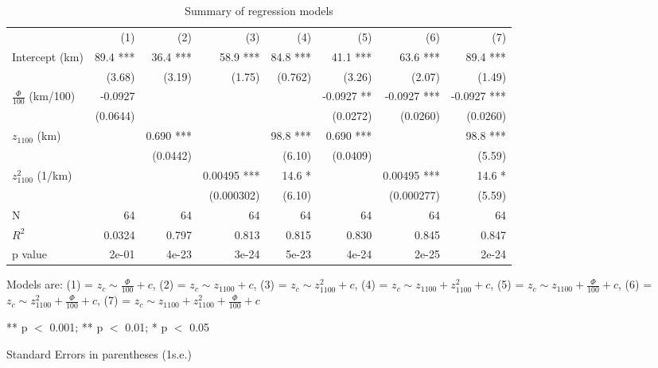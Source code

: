 \documentclass{article}
\begin{document}
\begin{table}
	\begin{threeparttable}
		\captionsetup{labelformat=empty}
		\caption{Summary of regression models}
		\setlength{\tabcolsep}{4pt}
\begin{tabularx}{\textwidth}{L{1} R{1} R{1} R{1} R{1} R{1} R{1} R{1}}
	
	\toprule
	
	& (1) & (2) & (3) & (4) & (5) & (6) & (7) \\
	
	\cmidrule(r){2-8}
	
	Intercept (km) & 89.4 *** & 36.4 *** & 58.9 *** & 84.8 *** & 41.1 *** & 63.6 *** & 89.4 *** \\
	& (3.68) & (3.19) & (1.75) & (0.762) & (3.26) & (2.07) & (1.49) \\
	$\frac{\Phi}{100}$ (km/100) & -0.0927 & & & & -0.0927 ** & -0.0927 *** & -0.0927 *** \\
	& (0.0644) & & & & (0.0272) & (0.0260) & (0.0260) \\
	$z_{1100}$ (km) & & 0.690 *** &  & 98.8 *** & 0.690 *** & & 98.8 *** \\
	& & (0.0442) & & (6.10) & (0.0409) & & (5.59) \\
	$z_{1100}^{2}$ (1/km) & & & 0.00495 *** & 14.6 * & & 0.00495 *** & 14.6 * \\
	& & & (0.000302) & (6.10) & & (0.000277) & (5.59) \\

	\cmidrule(r){2-8}
	
	N & 64 & 64 & 64 & 64 & 64 & 64 & 64 \\
	$R^2$ & 0.0324 & 0.797 & 0.813 & 0.815 & 0.830 & 0.845 & 0.847 \\
	p value & 2e-01 & 4e-23 & 3e-24 & 5e-23 & 4e-24 & 2e-25 & 2e-24 \\
	
	\bottomrule
	
\end{tabularx}
\begin{tablenotes}
\item Models are:
(1) = $z_{c}\sim\frac{\Phi}{100}+c$,
(2) = $z_{c}\sim{}z_{1100}+c$,
(3) = $z_{c}\sim{}z_{1100}^2+c$,
(4) = $z_{c}\sim{}z_{1100}+z_{1100}^2+c$,
(5) = $z_{c}\sim{}z_{1100}+\frac{\Phi}{100}+c$,
(6) = $z_{c}\sim{}z_{1100}^2+\frac{\Phi}{100}+c$,
(7) = $z_{c}\sim{}z_{1100}+z_{1100}^2+\frac{\Phi}{100}+c$
\item *** p $<$ 0.001;  ** p $<$ 0.01;  * p $<$ 0.05 
\item Standard Errors in parentheses  (1s.e.)
\end{tablenotes}
\end{threeparttable}
\end{table}
\end{document}
